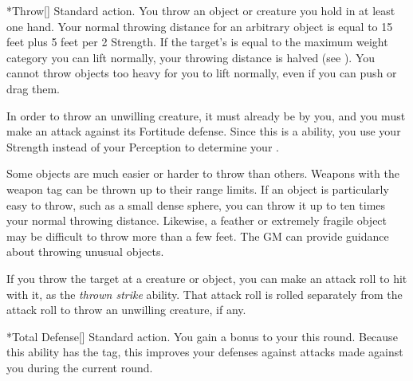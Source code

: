     \begin{activeability}*{Throw}[]
      \abilityusagetime Standard action.
      \rankline
      You throw an object or creature you hold in at least one hand.
      Your normal throwing distance for an arbitrary object is equal to 15 feet plus 5 feet per 2 Strength.
      If the target's  is equal to the maximum weight category you can lift normally, your throwing distance is halved (see ).
      You cannot throw objects too heavy for you to lift normally, even if you can push or drag them.

      In order to throw an unwilling creature, it must already be \grappled by you, and you must make an attack against its Fortitude defense.
      Since this is a  ability, you use your Strength instead of your Perception to determine your .

      Some objects are much easier or harder to throw than others.
      Weapons with the  weapon tag can be thrown up to their range limits.
      If an object is particularly easy to throw, such as a small dense sphere, you can throw it up to ten times your normal throwing distance.
      Likewise, a feather or extremely fragile object may be difficult to throw more than a few feet.
      The GM can provide guidance about throwing unusual objects.

      If you throw the target at a creature or object, you can make an attack roll to hit with it, as the \textit{thrown strike} ability.
      That attack roll is rolled separately from the attack roll to throw an unwilling creature, if any.
    \end{activeability}

    \begin{activeability}*{Total Defense}[]
      \abilityusagetime Standard action.
      \rankline
      You gain a  bonus to your  this round.
      Because this ability has the  tag, this improves your defenses against attacks made against you during the current round.
    \end{activeability}

